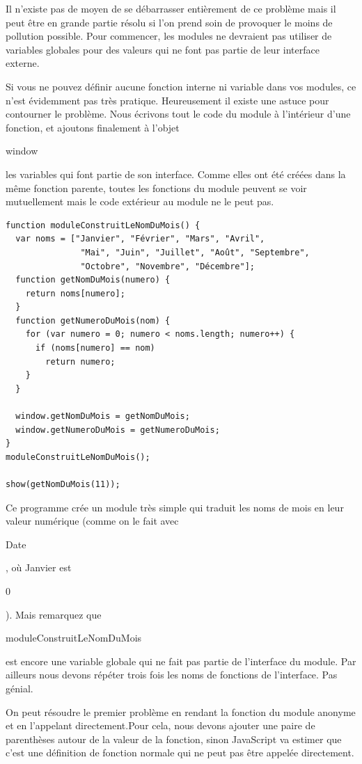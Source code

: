\documentclass{FramateX}
\renewcommand{\texttt}[1]{\begin{sffamily}{#1}\end{sffamily}}
\begin{document}
Il n'existe pas de moyen de se débarrasser entièrement de ce problème
mais il peut être en grande partie résolu si l'on prend soin de
provoquer le moins de pollution possible. Pour commencer, les modules ne
devraient pas utiliser de variables globales pour des valeurs qui ne
font pas partie de leur interface externe.

\begin{center}\end{center}

Si vous ne pouvez définir aucune fonction interne ni variable dans vos
modules, ce n'est évidemment pas très pratique. Heureusement il existe
une astuce pour contourner le problème. Nous écrivons tout le code du
module à l'intérieur d'une fonction, et ajoutons finalement à l'objet
\texttt{window} les variables qui font partie de son interface. Comme
elles ont été créées dans la même fonction parente, toutes les fonctions
du module peuvent se voir mutuellement mais le code extérieur au module
ne le peut pas.

\begin{lstlisting}
function moduleConstruitLeNomDuMois() {
  var noms = ["Janvier", "Février", "Mars", "Avril",
               "Mai", "Juin", "Juillet", "Août", "Septembre",
               "Octobre", "Novembre", "Décembre"];
  function getNomDuMois(numero) {
    return noms[numero];
  }
  function getNumeroDuMois(nom) {
    for (var numero = 0; numero < noms.length; numero++) {
      if (noms[numero] == nom)
        return numero;
    }
  }

  window.getNomDuMois = getNomDuMois;
  window.getNumeroDuMois = getNumeroDuMois;
}
moduleConstruitLeNomDuMois();

show(getNomDuMois(11));
\end{lstlisting}
Ce programme crée un module très simple qui traduit les noms de mois en
leur valeur numérique (comme on le fait avec \texttt{Date}, où Janvier
est \texttt{0}). Mais remarquez que \texttt{moduleConstruitLeNomDuMois}
est encore une variable globale qui ne fait pas partie de l'interface du
module. Par ailleurs nous devons répéter trois fois les noms de
fonctions de l'interface. Pas génial.

\begin{center}\end{center}

On peut résoudre le premier problème en rendant la fonction du module
anonyme et en l'appelant directement.Pour cela, nous devons ajouter une
paire de parenthèses autour de la valeur de la fonction, sinon
JavaScript va estimer que c'est une définition de fonction normale qui
ne peut pas être appelée directement.
\end{document}
